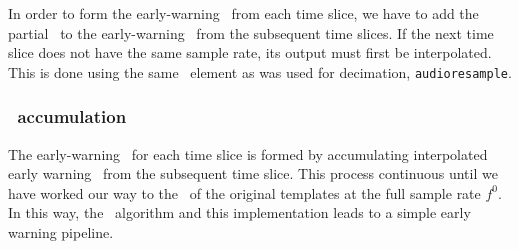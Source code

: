 In order to form the early-warning \SNR\ from each time slice, we have to add
the partial \SNR\ to the early-warning \SNR\ from the subsequent time slices.
If the next time slice does not have the same sample rate, its output must
first be interpolated.  This is done using the same \gstreamer\ element as was
used for decimation, {\tt audioresample}.  

\subsubsection{\SNR\ accumulation}

The early-warning \SNR\ for each time slice is formed by accumulating interpolated early
warning \SNR\ from the subsequent time slice.  This process continuous until we have 
worked our way to the \SNR\ of the original templates at the full sample rate $f^0$.  In 
this way, the \lloid\ algorithm and this implementation leads to a simple early warning
pipeline.
